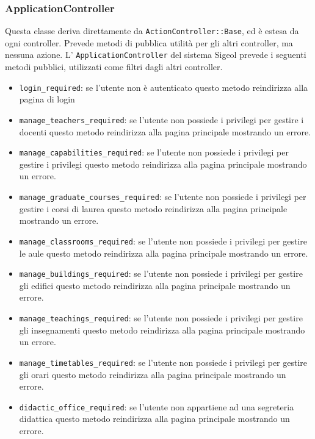 \documentclass[11pt,a4paper]{article}
\begin{document}
\subsubsection{ApplicationController}
Questa classe deriva direttamente da \verb|ActionController::Base|, ed è estesa da ogni controller. Prevede metodi di pubblica utilità per gli altri controller, ma nessuna azione. L' \verb|ApplicationController| del sistema Sigeol prevede i seguenti metodi pubblici, utilizzati come filtri dagli altri controller.
\begin{itemize}
 \item \verb|login_required|: se l'utente non è autenticato questo metodo reindirizza alla pagina di login
 \item \verb|manage_teachers_required|: se l'utente non possiede i privilegi per gestire i docenti questo metodo reindirizza alla pagina principale mostrando un errore.
 \item \verb|manage_capabilities_required|: se l'utente non possiede i privilegi per gestire i privilegi questo metodo reindirizza alla pagina principale mostrando un errore.
 \item \verb|manage_graduate_courses_required|: se l'utente non possiede i privilegi per gestire i corsi di laurea questo metodo reindirizza alla pagina principale mostrando un errore.
 \item \verb|manage_classrooms_required|: se l'utente non possiede i privilegi per gestire le aule questo metodo reindirizza alla pagina principale mostrando un errore.
 \item \verb|manage_buildings_required|: se l'utente non possiede i privilegi per gestire gli edifici questo metodo reindirizza alla pagina principale mostrando un errore.
 \item \verb|manage_teachings_required|: se l'utente non possiede i privilegi per gestire gli insegnamenti questo metodo reindirizza alla pagina principale mostrando un errore.
 \item \verb|manage_timetables_required|: se l'utente non possiede i privilegi per gestire gli orari questo metodo reindirizza alla pagina principale mostrando un errore.
 \item \verb|didactic_office_required|: se l'utente non appartiene ad una segreteria didattica questo metodo reindirizza alla pagina principale mostrando un errore.
\end{itemize}
\end{document}
